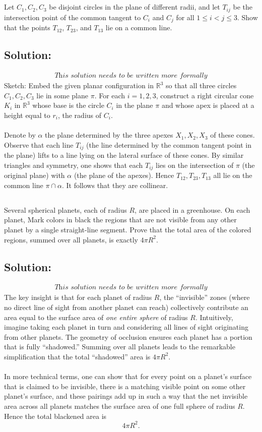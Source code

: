 \documentclass[11pt, a4paper, oneside]{article}
\newcommand{\solution}[1][]{\subsection*{#1}\hfill \par}
\theoremstyle{remark}
\theoremstyle{lemma}
\begin{document}
\subsection{}
Let $C_{1}, C_{2}, C_{3}$ be disjoint circles in the plane of different radii, and let $T_{ij}$ be the intersection point of the common tangent to $C_{i}$ and $C_{j}$ for all $1 \le i < j \le 3$. Show that the points $T_{12}$, $T_{23}$, and $T_{13}$ lie on a common line.
\solution[Solution:]
\[
\substack{\textit{This solution needs to be written more formally}}
\]
Sketch: Embed the given planar configuration in $\mathbb{R}^3$ so that all three circles $C_{1}, C_{2}, C_{3}$ lie in some plane $\pi$. For each $i = 1,2,3$, construct a right circular cone $K_{i}$ in $\mathbb{R}^3$ whose base is the circle $C_i$ in the plane $\pi$ and whose apex is placed at a height equal to $r_i$, the radius of $C_i$. 
\\\\
Denote by $\alpha$ the plane determined by the three apexes $X_{1}, X_{2}, X_{3}$ of these cones. Observe that each line $T_{ij}$ (the line determined by the common tangent point in the plane) lifts to a line lying on the lateral surface of these cones. By similar triangles and symmetry, one shows that each $T_{ij}$ lies on the intersection of $\pi$ (the original plane) with $\alpha$ (the plane of the apexes). Hence $T_{12}, T_{23}, T_{13}$ all lie on the common line $\pi \cap \alpha$. It follows that they are collinear.
\subsection{}
Several spherical planets, each of radius $R$, are placed in a greenhouse. On each planet, Mark colors in black the regions that are not visible from any other planet by a single straight-line segment. Prove that the total area of the colored regions, summed over all planets, is exactly $4\pi R^{2}$.
\solution[Solution:]
\[
\substack{\textit{This solution needs to be written more formally}}
\]
The key insight is that for each planet of radius $R$, the ``invisible'' zones (where no direct line of sight from another planet can reach) collectively contribute an area equal to the surface area of \emph{one entire sphere} of radius $R$. Intuitively, imagine taking each planet in turn and considering all lines of sight originating from other planets. The geometry of occlusion ensures each planet has a portion that is fully ``shadowed.'' Summing over all planets leads to the remarkable simplification that the total ``shadowed'' area is $4\pi R^2$. 
\\\\
In more technical terms, one can show that for every point on a planet’s surface that is claimed to be invisible, there is a matching visible point on some other planet’s surface, and these pairings add up in such a way that the net invisible area across all planets matches the surface area of one full sphere of radius $R$. Hence the total blackened area is 
\[
4\pi R^2.
\]
\end{document}
